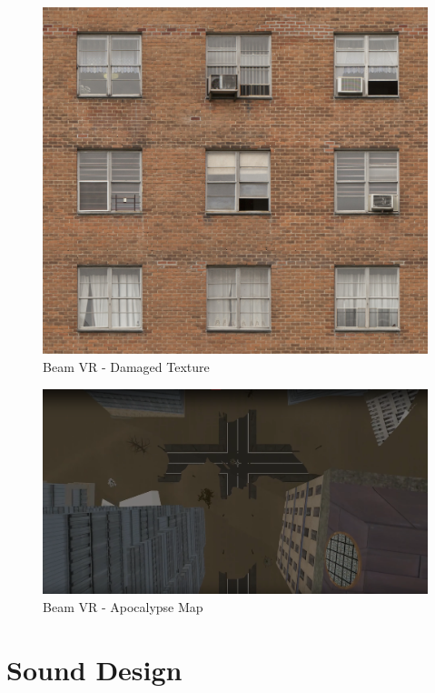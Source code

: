 \begin {figure}
    \includegraphics[scale=0.18]{pics/beamvr_damaged_texture}
    \caption{Beam VR - Damaged Texture}
    \label{fig:beamvr_damaged_texture}
\end {figure}

\begin {figure}
    \includegraphics[scale=0.18]{pics/beamvr_apocalypse-overview}
    \caption{Beam VR - Apocalypse Map}
    \label{fig:beamvr_apocalypse_map}
\end {figure}



\section{Sound Design}\label{sec:sound}

